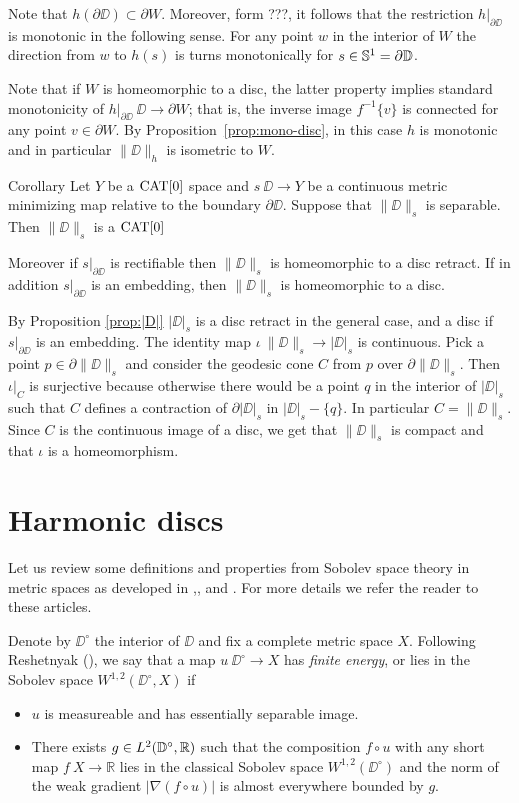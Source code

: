 \documentclass{article}
\begin{document}
Note that $h(\partial\DD)\subset \partial W$.
Moreover, form ???, it follows that the restriction $h|_{\partial\DD}$ is monotonic in the following sense.
For any point $w$ in the interior of $W$ the direction from $w$ to $h(s)$ is turns monotonically for $s\in \mathbb{S}^1=\partial\mathbb{D}$.

Note that if $W$ is homeomorphic to a disc, the latter property implies standard monotonicity of $h|_{\partial\DD}\:\DD\to\partial W$;
that is, the inverse image $f^{-1}\{v\}$ is connected for any point $v\in\partial W$.
By Proposition~\ref{prop:mono-disc}, in this case $h$ is monotonic and in particular $\|\DD\|_h$ is isometric to $W$.
\qeds


\begin{thm}{Corollary}\label{cor:main}
Let $Y$ be a $\mathop{\rm CAT}\nolimits[0]$ space 
and $s\:\DD\to Y$ be a continuous metric minimizing map relative to the boundary $\partial\DD$.
Suppose that $\|\DD\|_s$  is separable.
Then $\|\DD\|_s$ is a $\mathop{\rm CAT}\nolimits[0]$

Moreover if $s|_{\partial\DD}$ is rectifiable then $\|\DD\|_s$ is homeomorphic to a  disc retract. 
If in addition  $s|_{\partial\DD}$ is an embedding,
then $\|\DD\|_s$ is homeomorphic to a disc.
\end{thm}

By Proposition \ref{prop:|D|} $|\DD|_s$ is a disc retract in the general case, and a disc if $s|_{\partial\DD}$ is an embedding.
The identity map $\iota\:\|\DD\|_s\to |\DD|_s$ is continuous.
Pick a point $p\in\partial\|\DD\|_s$ and consider the geodesic 
cone $C$ from $p$ over $\partial\|\DD\|_s$.
Then $\iota|_C$ is surjective because otherwise there would be a point $q$ in the 
interior of $|\DD|_s$ such that $C$ defines a contraction of $\partial|\DD|_s$ in $|\DD|_s-\{q\}$. 
In particular $C=\|\DD\|_s$.
Since $C$ is the continuous image of a disc, we get that $\|\DD\|_s$ is compact and that $\iota$ is a homeomorphism.
\qeds

\section{Harmonic discs}\label{Harmonic discs}

Let us review some definitions and properties from Sobolev space theory in metric spaces as developed in 
\cite{KS},\cite{R}, \cite{HKST} and \cite{LW}. 
For more details we refer the reader to these articles.

Denote by  $\DD^\circ$ the interior of $\DD$ and fix a complete metric space $X$.
Following Reshetnyak (\cite{R}), we say that a map $u\:\DD^\circ\to X$ has {\em finite energy}, or lies in the Sobolev space $W^{1,2}(\DD^\circ,X)$ if
\begin{itemize}
 \item $u$ is measureable and has essentially separable image. %
 \item There exists $g\in L^2(\mathbb{D}^\circ,\mathbb{R})$ such that the composition $f\circ u$ with any short map $f\:X\to \mathbb{R}$ 
lies in the classical Sobolev space $W^{1,2}(\DD^\circ)$
 and the norm of the weak gradient $|\nabla(f\circ u)|$ is almost everywhere bounded by $g$.
\end{itemize}
\end{document}
